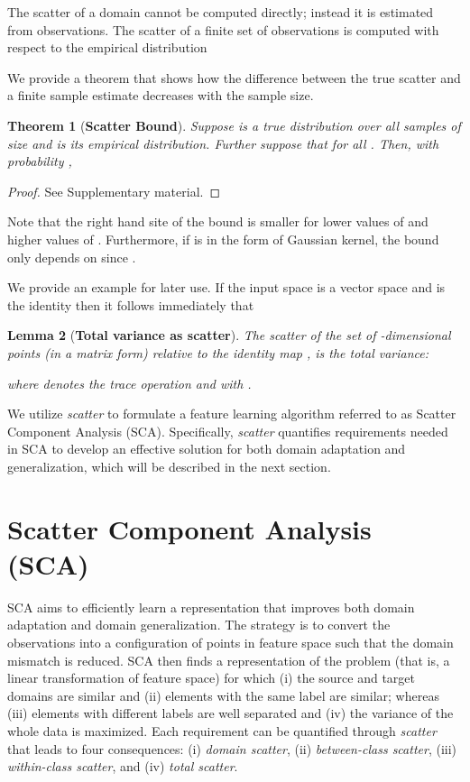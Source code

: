 \documentclass[10pt,journal,compsoc]{IEEEtran}
\newtheorem{thm}{Theorem}
\newtheorem{lem}[thm]{Lemma}
\begin{document}
The scatter of a domain cannot be computed directly; instead it is estimated from observations. 
The scatter of a finite set of observations  is computed with respect to the empirical distribution 


We provide a theorem that shows how the difference between the true scatter and a finite sample estimate decreases with the sample size.
\begin{thm}[\textbf{Scatter Bound}] 
	\label{t:bound}
	Suppose  is a true distribution over all samples of size  and  is its empirical distribution. Further suppose that  for all . Then, with probability ,
	
\end{thm}

\begin{proof} See Supplementary material. \end{proof}
\noindent Note that the right hand site of the bound is smaller for lower values of  and higher values of . 
Furthermore, if  is in the form of Gaussian kernel, the bound only depends on  since .

We provide an example for later use. If the input space is a vector space and  is the identity then it follows immediately that
\begin{lem}[\textbf{Total variance as scatter}]	
	\label{t:total_variance}
	The scatter of the set of -dimensional points (in a matrix form)  relative to the identity map 
	, is the total variance:
	
	where  denotes the trace operation and  with .
\end{lem}


We utilize \emph{scatter} to formulate a feature learning algorithm referred to as Scatter Component Analysis (SCA).
Specifically, \emph{scatter} quantifies requirements needed in SCA to develop an effective solution for both domain adaptation and generalization, which will be described in the next section.


\vspace{-1em}
\section{Scatter Component Analysis (SCA)}
\label{sec:sca}
SCA aims to efficiently learn a representation that improves both domain adaptation and domain generalization. 
The strategy is to convert the observations into a configuration of points in feature space such that the domain mismatch is reduced. 
SCA then finds a representation of the problem (that is, a linear transformation of feature space) for which 
(i) the source and target domains are similar and 
(ii) elements with the same label are similar; whereas 
(iii) elements with different labels are well separated and 
(iv) the variance of the whole data is maximized.
Each requirement can be quantified through \emph{scatter} that leads to four consequences: (i) \emph{domain scatter}, (ii) \emph{between-class scatter}, (iii) \emph{within-class scatter}, and (iv) \emph{total scatter}.
\end{document}
